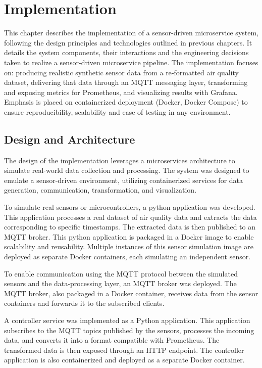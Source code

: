 \chapter{Implementation} \label{ch:implementation}

This chapter describes the implementation of a sensor-driven microservice system, following the design principles and technologies outlined in previous chapters. It details the system components, their interactions and the engineering decisions taken to realize a sensor-driven microservice pipeline. The implementation focuses on: producing realistic synthetic sensor data from a re‑formatted air quality dataset, delivering that data through an MQTT messaging layer, transforming and exposing metrics for Prometheus, and visualizing results with Grafana. Emphasis is placed on containerized deployment (Docker, Docker Compose) to ensure reproducibility, scalability and ease of testing in any environment.

\section{Design and Architecture}
The design of the implementation leverages a microservices architecture to simulate real-world data collection and processing. The system was designed to emulate a sensor-driven environment, utilizing containerized services for data generation, communication, transformation, and visualization.

To simulate real sensors or microcontrollers, a python application was developed. This application processes a real dataset of air quality data and extracts the data corresponding to specific timestamps. The extracted data is then published to an MQTT broker. This python application is packaged in a Docker image to enable scalability and reusability. Multiple instances of this sensor simulation image are deployed as separate Docker containers, each simulating an independent sensor.

To enable communication using the MQTT protocol between the simulated sensors and the data-processing layer, an MQTT broker was deployed. The MQTT broker, also packaged in a Docker container, receives data from the sensor containers and forwards it to the subscribed clients.

A controller service was implemented as a Python application. This application subscribes to the MQTT topics published by the sensors, processes the incoming data, and converts it into a format compatible with Prometheus. The transformed data is then exposed through an HTTP endpoint. The controller application is also containerized and deployed as a separate Docker container.

